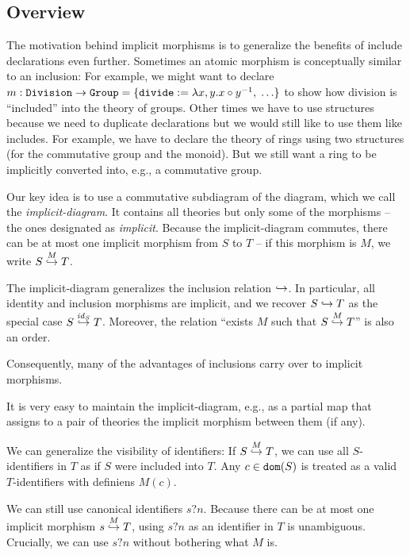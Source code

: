 \subsection{Overview}

The motivation behind implicit morphisms is to generalize the benefits of include declarations even further.
Sometimes an atomic morphism is conceptually similar to an inclusion: For example, we might want to declare $m:\cn{Division}\to\cn{Group}=\{\cn{divide} := \lambda x,y.x\circ y^{-1}, \;\ldots\}$ to show how division is ``included'' into the theory of groups.
Other times we have to use structures because we need to duplicate declarations but we would still like to use them like includes.
For example, we have to declare the theory of rings using two structures (for the commutative group and the monoid).
But we still want a ring to be implicitly converted into, e.g., a commutative group.

Our key idea is to use a commutative{\footnotemark} subdiagram of the \mmt diagram, which we call the \emph{implicit-diagram}.
It contains all theories but only some of the morphisms -- the ones designated as \emph{implicit}.
Because the implicit-diagram commutes, there can be at most one implicit morphism from $S$ to $T$ -- if this morphism is $M$, we write $\ipc{M}{S}{T}$.

The implicit-diagram generalizes the inclusion relation $\harr$.
In particular, all identity and inclusion morphisms are implicit, and we recover $S\harr T$ as the special case $\ipc{\id{S}}{S}{T}$.
Moreover, the relation ``exists $M$ such that $\ipc{M}{S}{T}$'' is also an order.

Consequently, many of the advantages of inclusions carry over to implicit morphisms.
\begin{compactitem}
\item It is very easy to maintain the implicit-diagram, e.g., as a partial map that assigns to a pair of theories the implicit morphism between them (if any).
\item We can generalize the visibility of identifiers: If $\ipc{M}{S}{T}$, we can use all $S$-identifiers in $T$ as if $S$ were included into $T$.
Any $c\in\dom{S}$ is treated as a valid $T$-identifiers with definiens $M(c)$.
\item We can still use canonical identifiers $s?n$. Because there can be at most one implicit morphism $\ipc{M}{s}{T}$, using $s?n$ as an identifier in $T$ is unambiguous.
Crucially, we can use $s?n$ without bothering what $M$ is.
\end{compactitem}

